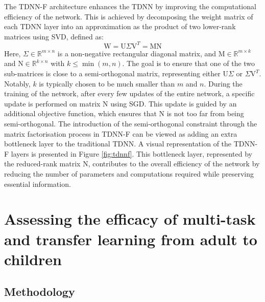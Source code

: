 The \ac{TDNN-F} architecture \cite{TDNN-F} enhances the \ac{TDNN} by improving the computational efficiency of the network. This is achieved by decomposing the weight matrix of each \ac{TDNN} layer into an approximation as the product of two lower-rank matrices using \ac{SVD}, defined as:
\begin{equation}
    \text{W} = \text{U}\Sigma \text{V}^T = \text{MN}
\end{equation}
Here, $\Sigma \in \mathbb{R}^{m \times n}$ is a non-negative rectangular diagonal matrix, and $\text{M} \in \mathbb{R}^{m \times k}$ and $\text{N} \in \mathbb{R}^{k \times n}$ with $k \leq \min(m,n)$. The goal is to ensure that one of the two sub-matrices is close to a semi-orthogonal matrix, representing either $\text{U}\Sigma$ or $\Sigma \text{V}^T$. Notably, $k$ is typically chosen to be much smaller than $m$ and $n$.
During the training of the network, after every few updates of the entire network, a specific update is performed on matrix $\text{N}$ using \ac{SGD}. This update is guided by an additional objective function, which ensures that $\text{N}$ is not too far from being semi-orthogonal.
The introduction of the semi-orthogonal constraint through the matrix factorisation process in \ac{TDNN-F} can be viewed as adding an extra bottleneck layer to the traditional \ac{TDNN}. A visual representation of the \ac{TDNN-F} layers is presented in Figure \ref{fig:tdnnf}. This bottleneck layer, represented by the reduced-rank matrix $\text{N}$, contributes to the overall efficiency of the network by reducing the number of parameters and computations required while preserving essential information.


\section{Assessing the efficacy of multi-task and transfer learning from adult to children}
\label{section:HMMDNNADULT2CHILD}
\subsection{Methodology}

